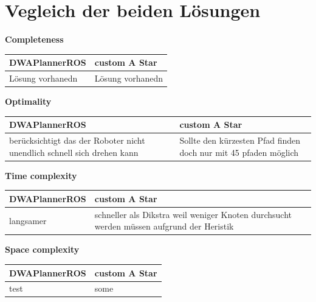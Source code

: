 \documentclass{article}
\begin{document}
\section{Vegleich der beiden Lösungen}

\textbf{Completeness}\newline

\begin{table}[!htbp]
    \begin{tabular}{p{7cm}|p{7cm}}
        DWAPlannerROS & custom A Star \\ \bottomrule
        Lösung vorhanedn & Lösung vorhanedn
    \end{tabular}
\end{table}

\textbf{Optimality}\newline

\begin{table}[!htbp]
    \begin{tabular}{p{7cm}|p{7cm}}
        DWAPlannerROS & custom A Star \\ \bottomrule
     berücksichtigt das der Roboter nicht unendlich schnell sich drehen kann & Sollte den kürzesten Pfad finden doch nur mit 45 pfaden möglich
    \end{tabular}
\end{table}


\textbf{Time complexity}\newline

\begin{table}[!htbp]
    \begin{tabular}{p{7cm}|p{7cm}}
        DWAPlannerROS & custom A Star \\ \bottomrule
    langsamer & schneller als Dikstra weil weniger Knoten durchsucht werden müssen aufgrund der Heristik
    \end{tabular}
\end{table}

\textbf{Space complexity}\newline

\begin{table}[!htbp]
    \begin{tabular}{p{7cm}|p{7cm}}
        DWAPlannerROS & custom A Star \\ \bottomrule
        test & some
    \end{tabular}
\end{table}
\end{document}
